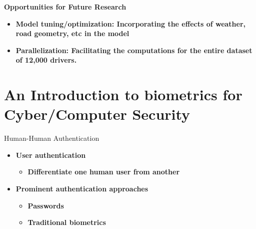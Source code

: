 \documentclass[aspectratio=43]{beamer}
\begin{document}
\begin{frame}{\textbf{Opportunities for Future Research}}
    \begin{dBox}
        \begin{itemize}
    \item<1> \textbf{\textcolor{miamired}{Model tuning/optimization:} Incorporating the effects of weather, road geometry, etc in the model}
    
    \item<2>\textbf{\textcolor{miamired}{Parallelization:} Facilitating the computations for the entire dataset of 12,000 drivers.}
    
    \end{itemize}
    \end{dBox}
\end{frame}

%
    
\section{An Introduction to biometrics for Cyber/Computer Security}

\begin{frame}{Human-Human Authentication}
    \begin{itemize}
    \item \textbf{User authentication} 
    \begin{itemize}
    \item \textbf{Differentiate one human user from another}
    \end{itemize}
    \item \textbf{Prominent authentication approaches}
    \begin{itemize}
    \item \textbf{Passwords}
    \item \textbf{Traditional biometrics}
    \end{itemize}
    \end{itemize}
\end{frame}
\end{document}
